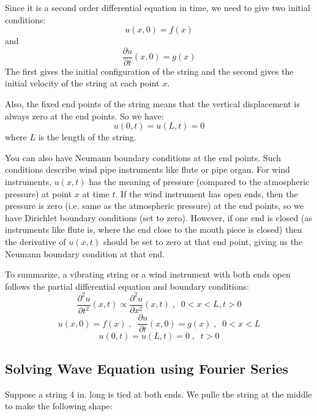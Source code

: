 \documentclass[12pt]{report}
\begin{document}
Since it is a second order differential equation in time, we need to give two initial conditions:
$$u(x,0)=f(x)$$
and
$$\frac{\partial u}{\partial t}(x,0) = g(x)$$
The first gives the initial configuration of the string and the second gives the initial velocity of the string at each point $x$.

Also, the fixed end points of the string means that the vertical displacement is always zero at the end points. So we have:
$$u(0,t)=u(L,t)=0$$
where $L$ is the length of the string.

You can also have Neumann boundary conditions at the end points. Such conditions describe wind pipe instruments like flute or pipe organ. For wind instruments, $u(x,t)$ has the meaning of pressure (compared to the atmospheric pressure) at point $x$ at time $t$. If the wind instrument has open ends, then the pressure is zero (i.e. same as the atmospheric pressure) at the end points, so we have Dirichlet boundary conditions (set to zero). However, if one end is closed (as instruments like flute is, where the end close to the mouth piece is closed) then the derivative of $u(x,t)$ should be set to zero at that end point, giving us the Neumann boundary condition at that end.

To summarize, a vibrating string or a wind instrument with both ends open follows the partial differential equation and boundary conditions:
$$ \frac{\partial^2 u}{\partial t^2}(x,t) \propto \frac{\partial^2 u}{\partial x^2}(x,t) \; , \; \; 0<x<L, t>0$$
$$u(x,0)=f(x)  \; , \; \; \frac{\partial u}{\partial t}(x,0) = g(x)  \; , \; \; 0<x<L$$
$$u(0,t)=u(L,t)=0 \; , \; \; t>0$$


\subsection*{Solving Wave Equation using Fourier Series}

Suppose a string 4 in. long is tied at both ends. We pulle the string at the middle to make the following shape:

\begin{center}  \end{center}
\end{document}

